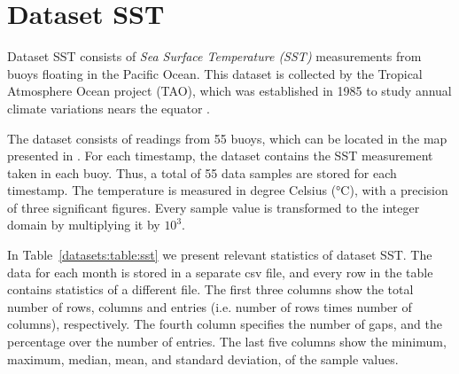 

\vspace{-15pt}
\section{Dataset SST}
\label{datasets:sst}


Dataset SST \cite{dataset:sst1} consists of \textit{Sea Surface Temperature (SST)} measurements from buoys floating in the Pacific Ocean. This dataset is collected by the Tropical Atmosphere Ocean project (TAO), which was established in 1985 to study annual climate variations nears the equator \cite{dataset:tao}.


The dataset consists of readings from 55 buoys, which can be located in the map presented in \cite{dataset:sst1}. For each timestamp, the dataset contains the SST measurement taken in each buoy. Thus, a total of 55 data samples are stored for each timestamp. The temperature is measured in degree Celsius (°C), with a precision of three significant figures. Every sample value is transformed to the integer domain by multiplying it by $10^3$.


In Table~\ref{datasets:table:sst} we present relevant statistics of dataset SST. The data for each month is stored in a separate csv file, and every row in the table contains statistics of a different file. The first three columns show the total number of rows, columns and entries (i.e. number of rows times number of columns), respectively. The fourth column specifies the number of gaps, and the percentage over the number of entries. The last five columns show the minimum, maximum, median, mean, and standard deviation, of the sample values.





